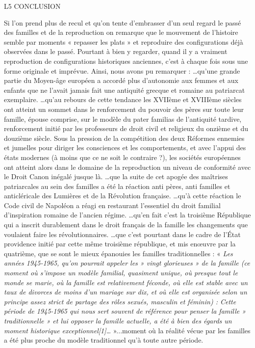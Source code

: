 L5 CONCLUSION
 
 
 Si l'on prend plus de recul et qu'on tente d'embrasser d'un seul regard le passé des familles et de la reproduction on remarque que le mouvement de l'histoire semble par moments « repasser les plats » et reproduire des configurations déjà observées dans le passé. Pourtant à bien y regarder, quand il y a vraiment reproduction de configurations historiques anciennes, c'est à chaque fois sous une forme originale et imprévue. 
 Ainsi, nous avons pu remarquer : 
 …qu'une grande partie du Moyen-âge européen a accordé plus d'autonomie aux femmes et aux enfants que ne l'avait jamais fait une antiquité grecque et romaine au patriarcat exemplaire. 
 …qu'au rebours de cette tendance les XVIIème et XVIIIème siècles ont atteint un sommet dans le renforcement du pouvoir des pères sur toute leur famille, épouse comprise, sur le modèle du pater familias de l'antiquité tardive, renforcement initié par les professeurs de droit civil et religieux du onzième et du douzième siècle. Sous la pression de la compétition des deux Réformes ennemies et jumelles pour diriger les consciences et les comportements, et avec l'appui des états modernes (à moins que ce ne soit le contraire ?), les sociétés européennes ont atteint alors dans le domaine de la reproduction un niveau de conformité avec le Droit Canon inégalé jusque là. 
 …que la suite de cet apogée des maîtrises patriarcales au sein des familles a été la réaction anti pères, anti familles et anticléricale des Lumières et de la Révolution française. 
 …qu'à cette réaction le Code civil de Napoléon a réagi en restaurant l'essentiel du droit familial d'inspiration romaine de l'ancien régime. 
 …qu'en fait c'est la troisième République qui a inscrit durablement dans le droit français de la famille les changements que voulaient faire les révolutionnaires. 
 …que c'est pourtant dans le cadre de l'État providence initié par cette même troisième république, et mis enœuvre par la quatrième, que se sont le mieux épanouies les familles traditionnelles : « \emph{ Les années 1945-1965, qu'on pourrait appeler les » vingt glorieuses » de la famille (ce moment où s'impose un modèle familial, quasiment unique, où presque tout le monde se marie, où la famille est relativement féconde, où elle est stable avec un taux de divorces de moins d'un mariage sur dix, et où elle est organisée selon un principe assez strict de partage des rôles sexués, masculin et féminin) : Cette période de 1945-1965 qui nous sert souvent de référence pour penser la famille » traditionnelle » et lui opposer la famille actuelle, a été à bien des égards un moment historique exceptionnel[1]…} »...moment où la réalité vécue par les familles a été plus proche du modèle traditionnel qu'à toute autre période.
